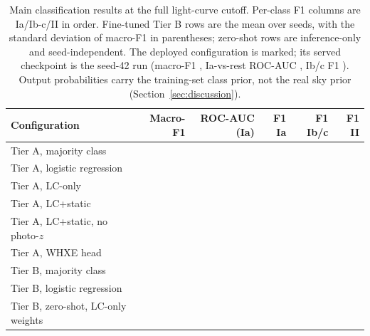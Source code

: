 \begin{table}[htb]
\centering
\caption{Main classification results at the full light-curve cutoff.
Per-class F1 columns are Ia/Ib-c/II in order. Fine-tuned Tier B rows are
the mean over \TierBNSeeds{} seeds, with the standard deviation of
macro-F1 in parentheses; zero-shot rows are inference-only and
seed-independent. The deployed configuration is marked; its served
checkpoint is the seed-42 run (macro-F1 \DeployedMacroF{}, Ia-vs-rest
ROC-AUC \DeployedRocAucIa{}, Ib/c F1 \DeployedFIbc{}). Output probabilities
carry the training-set class prior, not the real sky prior
(Section~\ref{sec:discussion}).}
\label{tab:mainresults}
\small
\begin{tabular}{L{4.6cm}rrrrr}
\toprule
Configuration & Macro-F1 & ROC-AUC (Ia) & F1 Ia & F1 Ib/c & F1 II \\
\midrule
Tier A, majority class & \BaselineMajTierAMacroF{} & \BaselineMajTierARocAucIa{} &
  \BaselineMajTierAFIa{} & \BaselineMajTierAFIbc{} & \BaselineMajTierAFII{} \\
Tier A, logistic regression & \BaselineLRTierAMacroF{} & \BaselineLRTierARocAucIa{} &
  \BaselineLRTierAFIa{} & \BaselineLRTierAFIbc{} & \BaselineLRTierAFII{} \\
Tier A, LC-only & \TierLCOnlyMacroFFull{} & \TierLCOnlyRocAucIaFull{} &
  \TierLCOnlyFIaFull{} & \TierLCOnlyFIbcFull{} & \TierLCOnlyFIIFull{} \\
Tier A, LC+static & \TierLCStaticMacroFFull{} & \TierLCStaticRocAucIaFull{} &
  \TierLCStaticFIaFull{} & \TierLCStaticFIbcFull{} & \TierLCStaticFIIFull{} \\
Tier A, LC+static, no photo-$z$ & \TierLCStaticNoPhotozMacroFFull{} &
  \TierLCStaticNoPhotozRocAucIaFull{} & \TierLCStaticNoPhotozFIaFull{} &
  \TierLCStaticNoPhotozFIbcFull{} & \TierLCStaticNoPhotozFIIFull{} \\
Tier A, WHXE head & \TierWHXEMacroFFull{} & \TierWHXERocAucIaFull{} &
  \TierWHXEFIaFull{} & \TierWHXEFIbcFull{} & \TierWHXEFIIFull{} \\
\midrule
Tier B, majority class & \BaselineMajTierBMacroF{} & \BaselineMajTierBRocAucIa{} &
  \BaselineMajTierBFIa{} & \BaselineMajTierBFIbc{} & \BaselineMajTierBFII{} \\
Tier B, logistic regression & \BaselineLRTierBMacroF{} & \BaselineLRTierBRocAucIa{} &
  \BaselineLRTierBFIa{} & \BaselineLRTierBFIbc{} & \BaselineLRTierBFII{} \\
Tier B, zero-shot, LC-only weights & \ZeroShotLCOnlyMacroF{} &
  \ZeroShotLCOnlyRocAucIa{} & \ZeroShotLCOnlyFIa{} & \ZeroShotLCOnlyFIbc{} &

\end{tabular}
\end{table}
